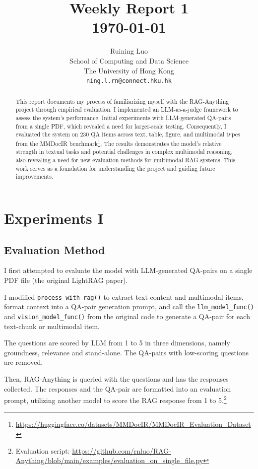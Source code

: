 \documentclass{article}
\title{
  Weekly Report 1 \\
  \vspace{1em}
  \small{\normalfont \today} 
}
\author{
  Ruining Luo \\
  School of Computing and Data Science \\
  The University of Hong Kong\\
  \texttt{ning.l.rn@connect.hku.hk} \\
}
\begin{document}
\maketitle

\begin{abstract}
This report documents my process of familiarizing myself with the RAG-Anything project through empirical evaluation.
I implemented an LLM-as-a-judge framework to assess the system's performance. 
Initial experiments with LLM-generated QA-pairs from a single PDF, which revealed a need for larger-scale testing. 
Consequently, I evaluated the system on 230 QA items across text, table, figure, and multimodal types from the MMDocIR benchmark\footnote{\url{https://huggingface.co/datasets/MMDocIR/MMDocIR_Evaluation_Dataset}}, 
The results demonstrates the model's relative strength in textual tasks and potential challenges in complex multimodal reasoning, also revealing a need for new evaluation methods for multimodal RAG systems. 
This work serves as a foundation for understanding the project and guiding future improvements.

\end{abstract}

\section{Experiments I}

  \subsection{Evaluation Method}
  I first attempted to evaluate the model with LLM-generated QA-pairs on a single PDF file (the original LightRAG paper).

  I modified \verb|process_with_rag()| to extract text content and multimodal items,
  format context into a QA-pair generation prompt,
  and call the \verb|llm_model_func()| and \verb|vision_model_func()| from the original code to generate a QA-pair for each text-chunk or multimodal item.

  The questions are scored by LLM from 1 to 5 in three dimensions, namely groundness, relevance and stand-alone.
  The QA-pairs with low-scoring questions are removed.

  Then, RAG-Anything is queried with the questions and has the responses collected.
  The responses and the QA-pair are formatted into an evaluation prompt, utilizing another model to score the RAG response from 1 to 5.\footnote{Evaluation script: \url{https://github.com/rnluo/RAG-Anything/blob/main/examples/evaluation_on_single_file.py}}
\end{document}
